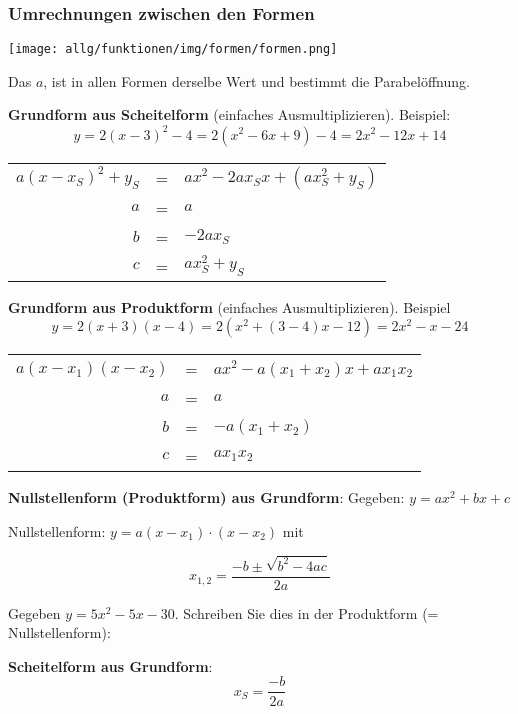 \subsubsection{Umrechnungen zwischen den Formen}

\begin{center}
  \texttt{[image: allg/funktionen/img/formen/formen.png]}
\end{center}

\begin{bemerkung}{}{}
  Das $a$,  ist in allen Formen derselbe Wert und bestimmt die Parabelöffnung.
  \end{bemerkung}
\newpage

\textbf{Grundform aus Scheitelform} (einfaches Ausmultiplizieren). Beispiel:
$$y=2(x-3)^2-4 = 2(x^2-6x+9)-4=2x^2-12x+14$$

\begin{tabular}{rcl}
$a(x-x_S)^2+y_S$ &=& $ax^2-2ax_Sx + (ax_S^2+y_S)$\\
  $a$ &=& $a$ \\
  $b$ &=& $-2ax_S$\\
  $c$ &=& $ax_S^2+y_S$
\end{tabular}


\textbf{Grundform aus Produktform} (einfaches Ausmultiplizieren). Beispiel
$$y=2(x+3)(x-4)=2(x^2 +(3-4)x - 12) = 2x^2-x-24$$

\begin{tabular}{rcl}
  $a(x-x_1)(x-x_2)$ &=& $ax^2 - a(x_1+x_2)x + ax_1x_2$\\
  $a$ &=& $a$ \\
  $b$ &=& $-a(x_1+x_2)$\\
  $c$ &=& $ax_1x_2$
\end{tabular}


\textbf{Nullstellenform (Produktform) aus Grundform}:
Gegeben: $y = ax^2 + bx + c$

Nullstellenform: $y = a(x-x_1)\cdot{}(x-x_2)$ mit

$$x_{1,2} = \frac{-b \pm \sqrt{b^2-4ac}}{2a}$$

\begin{beispiel}{}{}
Gegeben $y = 5x^2 - 5x - 30$. Schreiben Sie dies in der Produktform (=
Nullstellenform):
\end{beispiel}
\newpage


\textbf{Scheitelform aus Grundform}:
$$x_S=\frac{-b}{2a}$$

